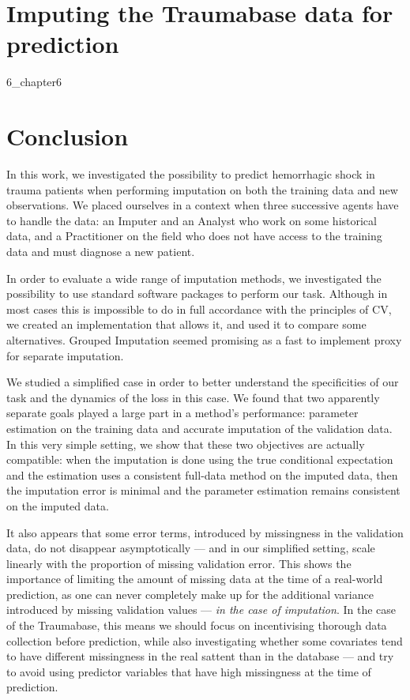 \documentclass[12pt, a4paper]{memoir}
\begin{document}
\chapter{Imputing the Traumabase data for prediction}
\label{analysis}
{6_chapter6}

\chapter*{Conclusion}
In this work, we investigated the possibility to predict hemorrhagic shock in trauma patients when performing imputation on both the training data and new observations. We placed ourselves in a context when three successive agents have to handle the data: an Imputer and an Analyst who work on some historical data, and a Practitioner on the field who does not have access to the training data and must diagnose a new patient.

In order to evaluate a wide range of imputation methods, we investigated the possibility to use standard software packages to perform our task. Although in most cases this is impossible to do in full accordance with the principles of CV, we created an implementation that allows it, and used it to compare some alternatives. Grouped Imputation seemed promising as a fast to implement proxy for separate imputation.

We studied a simplified case in order to better understand the specificities of our task and the dynamics of the loss in this case. We found that two apparently separate goals played a large part in a method's performance: parameter estimation on the training data and accurate imputation of the validation data. In this very simple setting, we show that these two objectives are actually compatible: when the imputation is done using the true conditional expectation and the estimation uses a consistent full-data method on the imputed data, then the imputation error is minimal and the parameter estimation remains consistent on the imputed data. 

It also appears that some error terms, introduced by missingness in the validation data, do not disappear asymptotically --- and in our simplified setting, scale linearly with the proportion of missing validation error. This shows the importance of limiting the amount of missing data at the time of a real-world prediction, as one can never completely make up for the additional variance introduced by missing validation values --- \emph{in the case of imputation}. In the case of the Traumabase, this means we should focus on incentivising thorough data collection before prediction, while also investigating whether some covariates tend to have different missingness in the real sattent than in the database --- and try to avoid using predictor variables that have high missingness at the time of prediction.
\end{document}

